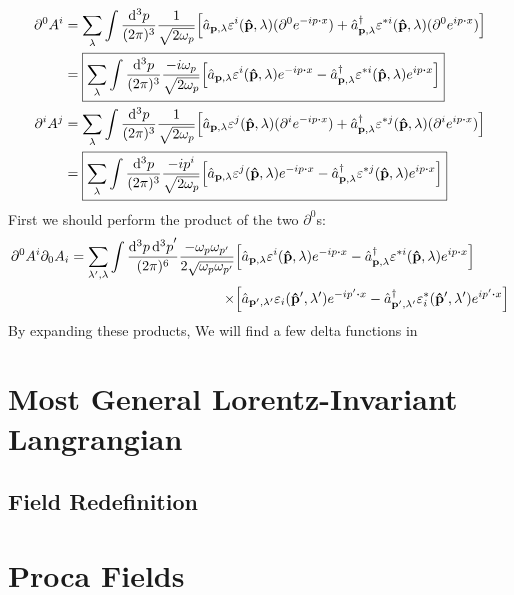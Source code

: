 \documentclass[12pt]{article}
\newcommand{\D}{\partial}
\newcommand{\veps}{\varepsilon}
\begin{document}
\begin{align*}
  \D^0A^i&=\sum_\lambda\int\frac{\dd[3]{p}}{(2\pi)^3}
  \frac1{\sqrt{2\omega_p}}
  \qty[\hat{a}_{\vb{p},\lambda}\veps^i(\vu{p},\lambda)(\D^0e^{-ip\vdot x})+
  \hat{a}^\dag_{\vb{p},\lambda}\veps^{*i}(\vu{p},\lambda)(\D^0e^{ip\vdot x})]\\
  &=\boxed{\sum_\lambda\int\frac{\dd[3]{p}}{(2\pi)^3}
  \frac{-i\omega_p}{\sqrt{2\omega_p}}
  \qty[\hat{a}_{\vb{p},\lambda}\veps^i(\vu{p},\lambda)e^{-ip\vdot x}-
  \hat{a}^\dag_{\vb{p},\lambda}\veps^{*i}(\vu{p},\lambda)e^{ip\vdot x}]}\\
  \D^iA^j&=\sum_\lambda\int\frac{\dd[3]{p}}{(2\pi)^3}
  \frac1{\sqrt{2\omega_p}}
  \qty[\hat{a}_{\vb{p},\lambda}\veps^j(\vu{p},\lambda)(\D^ie^{-ip\vdot x})+
  \hat{a}^\dag_{\vb{p},\lambda}\veps^{*j}(\vu{p},\lambda)(\D^ie^{ip\vdot x})]\\
  &=\boxed{\sum_\lambda\int\frac{\dd[3]{p}}{(2\pi)^3}
  \frac{-ip^i}{\sqrt{2\omega_p}}
  \qty[\hat{a}_{\vb{p},\lambda}\veps^j(\vu{p},\lambda)e^{-ip\vdot x}-
  \hat{a}^\dag_{\vb{p},\lambda}\veps^{*j}(\vu{p},\lambda)e^{ip\vdot x}]}
\end{align*}
First we should perform the product of the two $\D^0$s:
\begin{align*}
  \D^0A^i\D_0A_i=\sum_{\lambda',\lambda}\int\frac{\dd[3]{p}\dd[3]{p}'}{(2\pi)^6}
  \frac{-\omega_p\omega_{p'}}{2\sqrt{\omega_p\omega_{p'}}}
  &\qty[\hat{a}_{\vb{p},\lambda}\veps^i(\vu{p},\lambda)e^{-ip\vdot x}-
  \hat{a}^\dag_{\vb{p},\lambda}\veps^{*i}(\vu{p},\lambda)e^{ip\vdot x}]\\
  \times&\qty[\hat{a}_{\vb{p'},\lambda'}\veps_i(\vu{p}',\lambda')e^{-ip'\vdot x}-
  \hat{a}^\dag_{\vb{p'},\lambda'}\veps^*_i(\vu{p}',\lambda')e^{ip'\vdot x}]
\end{align*}
By expanding these products, We will find a few delta functions in 

\section{Most General Lorentz-Invariant Langrangian}

\subsection{Field Redefinition}

\section{Proca Fields}
\end{document}
